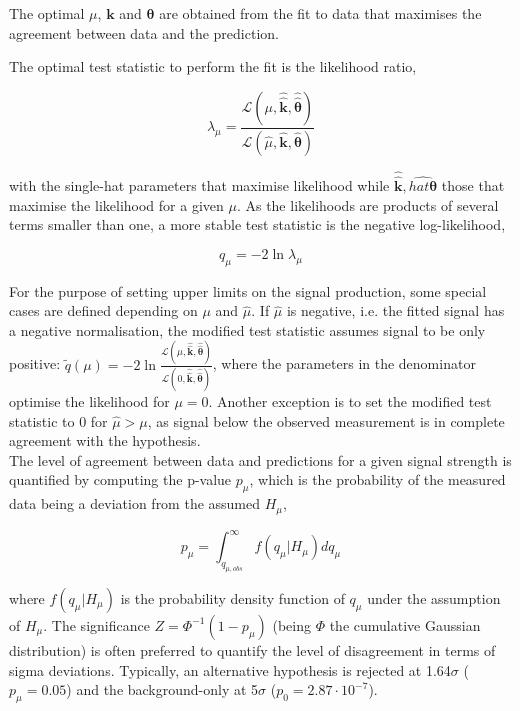 The optimal $\mu$, $\mathbf{k}$ and $\boldsymbol{\theta}$ are obtained from the fit to data that maximises the agreement between data and the prediction.

The optimal test statistic to perform the fit is the likelihood ratio, %

\begin{equation}
    \lambda_\mu = \frac{\mathscr{L}(\mu, \hat{\hat{\mathbf{k}}},\hat{\hat{\boldsymbol{\theta}}})}{\mathscr{L}(\hat{\mu}, \hat{\mathbf{k}},\hat{\boldsymbol{\theta}})}
\end{equation}

with the single-hat parameters that maximise likelihood while $\hat{\hat{\mathbf{k}}},\hat{hat{\boldsymbol{\theta}}}$ those that maximise the likelihood for a given $\mu$. As the likelihoods are products of several terms smaller than one, a more stable test statistic is the negative log-likelihood,

\begin{equation}
    q_\mu = -2\ln\lambda_\mu
\end{equation}

For the purpose of setting upper limits on the signal production, some special cases are defined depending on $\mu$ and $\hat{\mu}$. If $\hat{\mu}$ is negative, i.e. the fitted signal has a negative normalisation, the modified test statistic assumes signal to be only positive: $\tilde{q}(\mu)=-2\ln\frac{\mathscr{L}(\mu, \hat{\hat{\mathbf{k}}},\hat{\hat{\boldsymbol{\theta}}})}{\mathscr{L}(0, \hat{\hat{\mathbf{k}}},\hat{\hat{\boldsymbol{\theta}}})}$, where the parameters in the denominator optimise the likelihood for $\mu=0$. Another exception is to set the modified test statistic to 0 for $\hat{\mu}>\mu$, as signal below the observed measurement is in complete agreement with the hypothesis.\\

The level of agreement between data and predictions for a given signal strength is quantified by computing the p-value $p_\mu$, which is the probability of the measured data being a deviation from the assumed $H_\mu$,

\begin{equation}
    p_\mu = \int_{q_{\mu,obs}}^\infty f(q_\mu|H_\mu)dq_\mu
\end{equation}

where $f(q_\mu|H_\mu)$ is the probability density function of $q_\mu$ under the assumption of $H_\mu$. The significance $Z=\Phi^{-1}(1-p_\mu)$ (being $\Phi$ the cumulative Gaussian distribution) is often preferred to quantify the level of disagreement in terms of sigma deviations. Typically, an alternative hypothesis is rejected at 1.64$\sigma$ ($p_\mu=0.05$) and the background-only at 5$\sigma$ ($p_0=2.87\cdot10^{-7}$).\\

